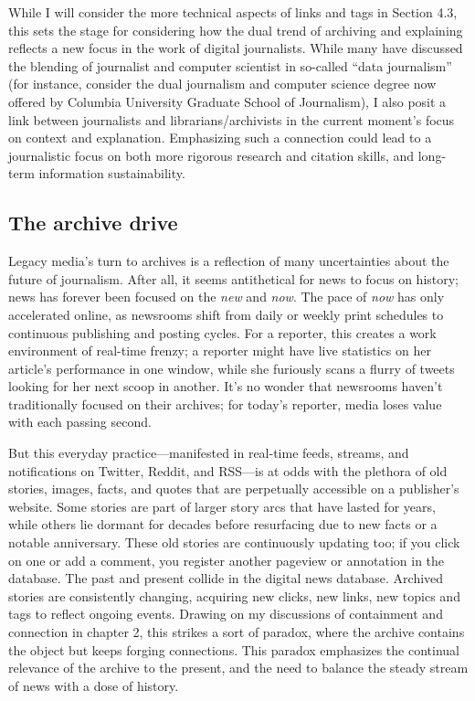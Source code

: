 While I will consider the more technical aspects of links and tags in Section 4.3, this sets the stage for considering how the dual trend of archiving and explaining reflects a new focus in the work of digital journalists. While many have discussed the blending of journalist and computer scientist in so-called ``data journalism'' (for instance, consider the dual journalism and computer science degree now offered by Columbia University Graduate School of Journalism), I also posit a link between journalists and librarians/archivists in the current moment's focus on context and explanation. Emphasizing such a connection could lead to a journalistic focus on both more rigorous research and citation skills, and long-term information sustainability.

\subsection{The archive drive}

Legacy media's turn to archives is a reflection of many uncertainties about the future of journalism. After all, it seems antithetical for news to focus on history; news has forever been focused on the \emph{new} and \emph{now}. The pace of \emph{now} has only accelerated online, as newsrooms shift from daily or weekly print schedules to continuous publishing and posting cycles. For a reporter, this creates a work environment of real-time frenzy; a reporter might have live statistics on her article's performance in one window, while she furiously scans a flurry of tweets looking for her next scoop in another. It's no wonder that newsrooms haven't traditionally focused on their archives; for today's reporter, media loses value with each passing second.

But this everyday practice---manifested in real-time feeds, streams, and notifications on Twitter, Reddit, and RSS---is at odds with the plethora of old stories, images, facts, and quotes that are perpetually accessible on a publisher's website. Some stories are part of larger story arcs that have lasted for years, while others lie dormant for decades before resurfacing due to new facts or a notable anniversary. These old stories are continuously updating too; if you click on one or add a comment, you register another pageview or annotation in the database. The past and present collide in the digital news database. Archived stories are consistently changing, acquiring new clicks, new links, new topics and tags to reflect ongoing events. Drawing on my discussions of containment and connection in chapter 2, this strikes a sort of paradox, where the archive contains the object but keeps forging connections. This paradox emphasizes the continual relevance of the archive to the present, and the need to balance the steady stream of news with a dose of history.

